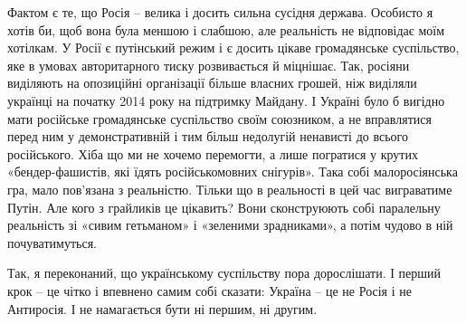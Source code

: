 Фактом є те, що Росія – велика і досить сильна сусідня держава. Особисто я
хотів би, щоб вона була меншою і слабшою, але реальність не відповідає моїм
хотілкам. У Росії є путінський режим і є досить цікаве громадянське
суспільство, яке в умовах авторитарного тиску розвивається й міцнішає. Так,
росіяни виділяють на опозиційні організації більше власних грошей, ніж виділяли
українці на початку 2014 року на підтримку Майдану. І Україні було б вигідно
мати російське громадянське суспільство своїм союзником, а не вправлятися перед
ним у демонстративній і тим більш недолугій ненависті до всього російського.
Хіба що ми не хочемо перемогти, а лише погратися у крутих «бендер-фашистів, які
їдять російськомовних снігурів». Така собі малоросіянська гра, мало пов'язана з
реальністю. Тільки що в реальності в цей час виграватиме Путін. Але кого з
грайликів це цікавить? Вони сконструюють собі паралельну реальність зі «сивим
гетьманом» і «зеленими зрадниками», а потім чудово в ній почуватимуться.

Так, я переконаний, що українському суспільству пора дорослішати. І перший крок
– це чітко і впевнено самим собі сказати: Україна – це не Росія і не Антиросія.
І не намагається бути ні першим, ні другим.


